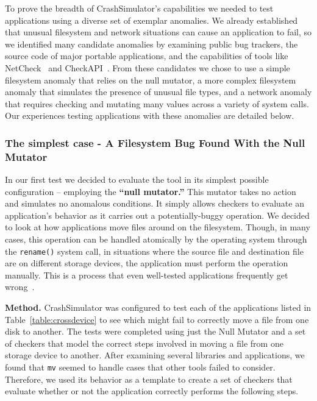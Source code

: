 To prove the breadth of CrashSimulator's capabilities we needed
to test applications
using a diverse set of exemplar anomalies.
We already established
that
unusual filesystem and network situations can cause an application to fail,
so we identified many candidate anomalies
by examining public bug trackers,
the source code of major portable applications, and the capabilities of
tools like NetCheck~\cite{Zhuang_NSDI_2014}
and CheckAPI~\cite{rasley2015detecting}.
From these candidates we
chose to use a simple filesystem anomaly that relies on the null
mutator,
a more complex filesystem anomaly that simulates
the presence of unusual file types,
and a network anomaly that requires
checking and mutating many values across a variety of system calls.
Our experiences testing applications with these anomalies are detailed below.

\subsubsection{The simplest case - A Filesystem Bug Found With the Null Mutator}
\label{sec-move-bugs}
In our first test we decided to evaluate the tool in its simplest possible
configuration -- employing the {\bf ``null mutator.''}
This mutator takes no action and simulates no anomalous conditions.
It simply allows checkers to evaluate an application's behavior
as it carries out a potentially-buggy operation.
We decided to look at how applications
move files around on the filesystem.
Though, in many cases, this operation can be handled
atomically by the operating system
through the {\tt rename()} system call,
in situations where
the source file and destination file are on different storage devices,
the application must perform the operation manually.
This is a process
that even well-tested applications
frequently get wrong~\cite{PHPRenameBug,PythonShutilBug,NodejsCopyBug}.

{\bf Method.}
CrashSimulator was configured
to test each of the applications listed in Table~\ref{table:crossdevice}
to see which might fail to correctly move a file from one disk to another.
The tests were completed using just the Null Mutator and a set of
checkers that model the correct steps involved in moving a file from one
storage device to another.
After examining several libraries and applications,
we found that
{\tt mv} seemed to handle cases that other tools failed to consider.
Therefore, we
used its behavior as a template to create a set of checkers
that evaluate whether or not
the application correctly performs the following
steps.

